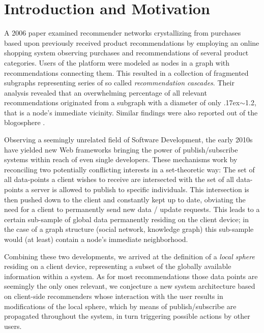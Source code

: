 \documentclass{llncs}
\begin{document}
\renewcommand{\thesubfigure}{\thefigure.\arabic{subfigure}}
\makeatletter
\renewcommand{\p@subfigure}{}
\renewcommand{\@thesubfigure}{\thesubfigure:\hskip\subfiglabelskip}
\makeatother


\section{Introduction and Motivation}
\label{sect:intro_motivation}

A 2006 paper \cite{leskovec2006recpatterns} examined recommender networks crystallizing from purchases based upon previously received product recommendations by employing an online shopping system observing purchases and recommendations of several product categories. Users of the platform were modeled as nodes in a graph with recommendations connecting them. This resulted in a collection of fragmented subgraphs representing series of so called \textit{recommendation cascades}. Their analysis revealed that an overwhelming percentage of all relevant recommendations originated from a subgraph with a diameter of only {\raise.17ex\hbox{$\scriptstyle\sim$}}1.2, that is a node's immediate vicinity. Similar findings were also reported out of the blogosphere \cite{leskovec2007blogpatterns}.

Observing a seemingly unrelated field of Software Development, the early 2010s have yielded new Web frameworks bringing the power of publish/subscribe systems within reach of even single developers. These mechanisms work by reconciling two potentially conflicting interests in a set-theoretic way: The set of all data-points a client wishes to receive are intersected with the set of all data-points a server is allowed to publish to specific individuals. This intersection is then pushed down to the client and constantly kept up to date, obviating the need for a client to permanently send new data / update requests. This leads to a certain sub-sample of global data permanently residing on the client device; in the case of a graph structure (social network, knowledge graph) this sub-sample would (at least) contain a node's immediate neighborhood.

Combining these two developments, we arrived at the definition of a \textit{local sphere} residing on a client device, representing a subset of the globally available information within a system. As for most recommendations those data points are seemingly the only ones relevant, we conjecture a new system architecture based on client-side recommenders whose interaction with the user results in modifications of the local sphere, which by means of publish/subscribe are propagated throughout the system, in turn triggering possible actions by other users.
\end{document}
